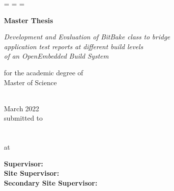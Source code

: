 \begin{titlepage}
  \oddsidemargin=\evensidemargin\relax
  \textwidth=\dimexpr{}\evensidemargin-2in\relax
  \hsize=\textwidth\relax

  \centering
    \begin{center}
       \vspace*{.02\textheight}
       \LARGE\textbf{Master Thesis}
            
       \vspace{1.0cm}
       \LARGE \textit{Development and Evaluation of BitBake class to bridge\\ application test reports at different build levels\\ of an OpenEmbedded Build System}
       
       \vspace{1.0cm}
       \Large\normalsize{for the academic degree of\\Master of Science}
       
       \vspace{1.5cm}
       \textbf{\getAuthor\\}
        {March 2022}\\ %
       \vspace{1.0cm}
       \normalsize
       submitted to\\[0.4cm]
       \getFaculty\\
       \department\\
       at \getUniversity \\
        \vspace{1.0cm}
        \qquad
    \vspace{0.8cm}
    \noindent
    \begin{flushleft}
    \textbf{Supervisor:}\normalsize{ \getSupervisor}\\
    \textbf{Site Supervisor:}\normalsize{ \getAdvisor}\\
    \textbf{Secondary Site Supervisor:}\normalsize{ \getSecondAdvisor}\\
    \end{flushleft}
      \end{center}
\end{titlepage}
